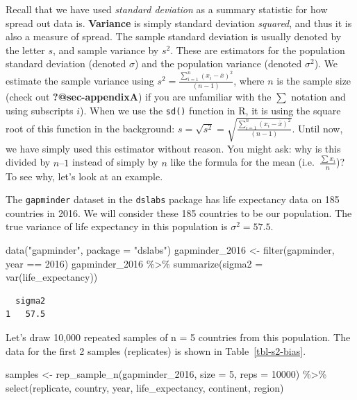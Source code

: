 \documentclass[
  letterpaper,
  DIV=11,
  numbers=noendperiod]{scrreprt}
\newenvironment{Shaded}{\begin{snugshade}}{\end{snugshade}}
\newcommand{\AttributeTok}[1]{\textcolor[rgb]{0.40,0.45,0.13}{#1}}
\newcommand{\DecValTok}[1]{\textcolor[rgb]{0.68,0.00,0.00}{#1}}
\newcommand{\FunctionTok}[1]{\textcolor[rgb]{0.28,0.35,0.67}{#1}}
\newcommand{\NormalTok}[1]{\textcolor[rgb]{0.00,0.23,0.31}{#1}}
\newcommand{\OtherTok}[1]{\textcolor[rgb]{0.00,0.23,0.31}{#1}}
\newcommand{\SpecialCharTok}[1]{\textcolor[rgb]{0.37,0.37,0.37}{#1}}
\newcommand{\StringTok}[1]{\textcolor[rgb]{0.13,0.47,0.30}{#1}}
\theoremstyle{definition}
\theoremstyle{remark}
\begin{document}
Recall that we have used \emph{standard deviation} as a summary
statistic for how spread out data is. \textbf{Variance} is simply
standard deviation \emph{squared}, and thus it is also a measure of
spread. The sample standard deviation is usually denoted by the letter
\(s\), and sample variance by \(s^2\). These are estimators for the
population standard deviation (denoted \(\sigma\)) and the population
variance (denoted \(\sigma^2\)). We estimate the sample variance using
\(s^2= \frac{\sum_{i = 1}^n(x_i - \bar{x})^2}{(n-1)}\), where \(n\) is
the sample size (check out \textbf{?@sec-appendixA}) if you are
unfamiliar with the \(\sum\) notation and using subscripts \(i\)). When
we use the \texttt{sd()} function in R, it is using the square root of
this function in the background:
\(s= \sqrt{s^2} = \sqrt{\frac{\sum_{i = 1}^n(x_i - \bar{x})^2}{(n-1)}}\).
Until now, we have simply used this estimator without reason. You might
ask: why is this divided by \(n – 1\) instead of simply by \(n\) like
the formula for the mean (i.e.~\(\frac{\sum x_i}{n}\))? To see why,
let's look at an example.

The \texttt{gapminder} dataset in the \texttt{dslabs} package has life
expectancy data on 185 countries in 2016. We will consider these 185
countries to be our population. The true variance of life expectancy in
this population is \(\sigma^2 = 57.5\).

\begin{Shaded}
\begin{Highlighting}[]
\FunctionTok{data}\NormalTok{(}\StringTok{"gapminder"}\NormalTok{, }\AttributeTok{package =} \StringTok{"dslabs"}\NormalTok{)}
\NormalTok{gapminder\_2016 }\OtherTok{\textless{}{-}} \FunctionTok{filter}\NormalTok{(gapminder, year }\SpecialCharTok{==} \DecValTok{2016}\NormalTok{)}
\NormalTok{gapminder\_2016 }\SpecialCharTok{\%\textgreater{}\%} 
  \FunctionTok{summarize}\NormalTok{(}\AttributeTok{sigma2 =} \FunctionTok{var}\NormalTok{(life\_expectancy))}
\end{Highlighting}
\end{Shaded}

\begin{verbatim}
  sigma2
1   57.5
\end{verbatim}

Let's draw 10,000 repeated samples of n = 5 countries from this
population. The data for the first 2 samples (replicates) is shown in
Table~\ref{tbl-s2-bias}.

\begin{Shaded}
\begin{Highlighting}[]
\NormalTok{samples }\OtherTok{\textless{}{-}} \FunctionTok{rep\_sample\_n}\NormalTok{(gapminder\_2016, }\AttributeTok{size =} \DecValTok{5}\NormalTok{, }\AttributeTok{reps =} \DecValTok{10000}\NormalTok{) }\SpecialCharTok{\%\textgreater{}\%} 
  \FunctionTok{select}\NormalTok{(replicate, country, year, life\_expectancy, continent, region)}
\end{Highlighting}
\end{Shaded}
\end{document}

